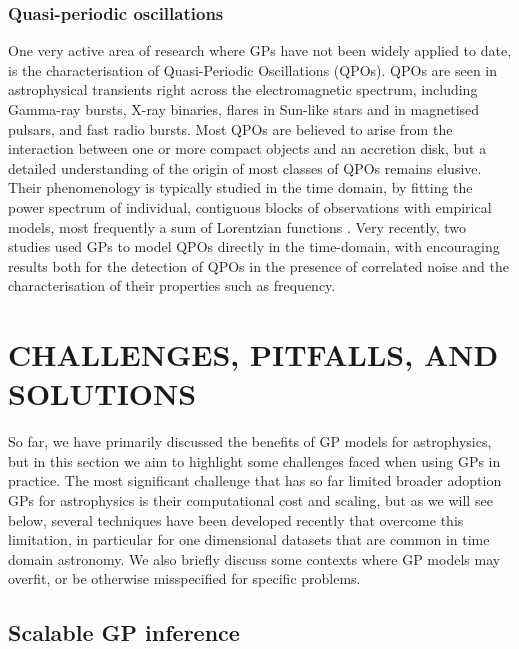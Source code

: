 \documentclass[letterpaper]{ar-1col}
\begin{document}
\subsubsection{Quasi-periodic oscillations}

One very active area of research where GPs have not been widely applied to date, is the characterisation of Quasi-Periodic Oscillations (QPOs). QPOs are seen in astrophysical transients right across the electromagnetic spectrum, including Gamma-ray bursts, X-ray binaries, flares in Sun-like stars and in magnetised pulsars, and fast radio bursts. Most QPOs are believed to arise from the interaction between one or more compact objects and an accretion disk, but a detailed understanding of the origin of most classes of QPOs remains elusive. Their phenomenology is typically studied in the time domain, by fitting the power spectrum of individual, contiguous blocks of observations with empirical models, most frequently a sum of Lorentzian functions \citep[see][and references therein]{ingram_motta_QPOs}. Very recently, two studies \citep{2021ApJ...907..105Y, 2022ApJ...936...17H} used GPs to model QPOs directly in the time-domain, with encouraging results both for the detection of QPOs in the presence of correlated noise and the characterisation of their properties such as frequency.

\section{CHALLENGES, PITFALLS, AND SOLUTIONS}
\label{sec:challenges}

So far, we have primarily discussed the benefits of GP models for astrophysics, but in this section we aim to highlight some challenges faced when using GPs in practice.
The most significant challenge that has so far limited broader adoption GPs for astrophysics is their computational cost and scaling, but as we will see below, several techniques have been developed recently that overcome this limitation, in particular for one dimensional datasets that are common in time domain astronomy.
We also briefly discuss some contexts where GP models may overfit, or be otherwise misspecified for specific problems.

\subsection{Scalable GP inference}
\label{sec:fast}
\end{document}
